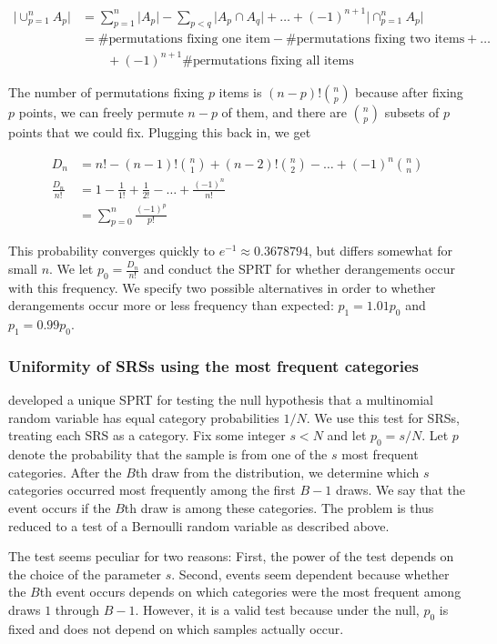 \documentclass[12pt]{article}
\begin{document}
\begin{align*}
\lvert \cup_{p=1}^n A_p \rvert &= \sum_{p=1}^n \lvert A_p \rvert - \sum_{p < q} \lvert A_p \cap A_q \rvert + \dots + (-1)^{n+1}\lvert \cap_{p=1}^n A_p \rvert \\
&= \text{\# permutations fixing one item} - \text{\# permutations fixing two items} + \dots \\
& \qquad + (-1)^{n+1} \text{\# permutations fixing all items}
\end{align*}

The number of permutations fixing $p$ items is $(n-p)! {n \choose p}$ because after fixing $p$ points, we can freely permute $n-p$ of them, and there are ${n\choose p}$ subsets of $p$ points that we could fix. 
Plugging this back in, we get

\begin{align*}
D_n &= n! - (n-1)!{n \choose 1} + (n-2)!{n \choose 2} - \dots + (-1)^{n}{n \choose n} \\
\frac{D_n}{n!} &= 1 - \frac{1}{1!} + \frac{1}{2!} - \dots + \frac{(-1)^{n}}{n!} \\
&= \sum_{p=0}^n \frac{(-1)^{p}}{p!}
\end{align*}

This probability converges quickly to $e^{-1} \approx 0.3678794$, but differs somewhat for small $n$. 
We let $p_0 = \frac{D_n}{n!}$ and conduct the SPRT for whether derangements occur with this frequency.
We specify two possible alternatives in order to whether derangements occur more or less frequency than expected: $p_1 = 1.01 p_0$ and $p_1 = 0.99 p_0$.


\subsubsection{Uniformity of SRSs using the most frequent categories}
\citet{weiss_sequential_1962} developed a unique SPRT for testing the null hypothesis that a multinomial random variable has equal category probabilities $1/N$.
We use this test for SRSs, treating each SRS as a category.
Fix some integer $s<N$ and let $p_0 = s/N$. 
Let $p$ denote the probability that the sample is from one of the $s$ most frequent categories. 
After the $B$th draw from the distribution, we determine which $s$ categories occurred most frequently among the first $B-1$ draws. 
We say that the event occurs if the $B$th draw is among these categories.
The problem is thus reduced to a test of a Bernoulli random variable as described above.

The test seems peculiar for two reasons:
First, the power of the test depends on the choice of the parameter $s$.
Second, events seem dependent because whether the $B$th event occurs depends on which categories were the most frequent among draws $1$ through $B-1$.
However, it is a valid test because under the null, $p_0$ is fixed and does not depend on which samples actually occur.
\end{document}
